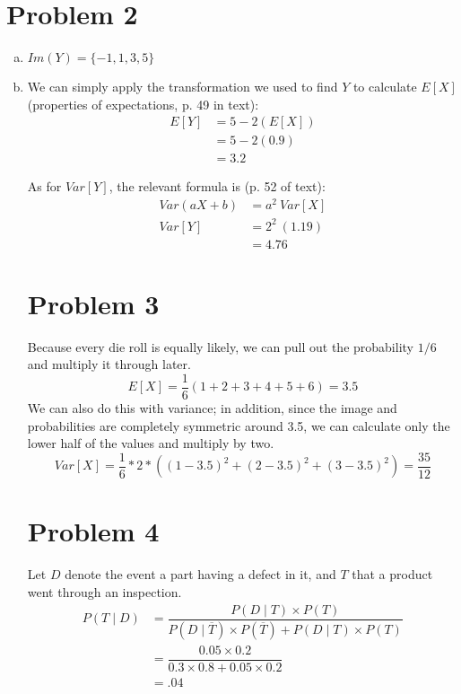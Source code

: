 \documentclass[11pt]{article}
\begin{document}
\section*{Problem 2}
\begin{enumerate}[(a)]
	\item $Im(Y) = \{-1, 1, 3, 5\}$
	
	\item We can simply apply the transformation we used to find $Y$ to calculate $E[X]$ (properties of expectations, p. 49 in text):
		\begin{align*}
		E[Y] &= 5 - 2( E[X] ) \\
		&= 5 - 2( 0.9 ) \\
		&= 3.2
		\end{align*}
		
		As for $Var[Y]$, the relevant formula is (p. 52 of text):
		\begin{align*}
			Var(aX + b) &= a^2\ Var[X] \\
			Var[Y] &= 2^2\ (1.19) \\
			&= 4.76
		\end{align*}
		
\section*{Problem 3}
Because every die roll is equally likely, we can pull out the probability $1/6$ and multiply it through later.
	\[E[X] = \dfrac{1}{6}( 1+2+3+4+5+6) = 3.5 \]
We can also do this with variance; in addition, since the image and probabilities are completely symmetric around 3.5, we can calculate only the lower half of the values and multiply by two.
	\[Var[X] = \dfrac{1}{6} * 2 * ( (1-3.5)^2 + (2 - 3.5)^2 + (3-3.5)^2 ) = \dfrac{35}{12} \]
	
\section*{Problem 4}
Let $D$ denote the event a part having a defect in it, and $T$ that a product went through an inspection.
\begin{align*}
	P(T \mid D) &= \dfrac{P(D \mid T) \times P(T)}{P(D \mid \overline{T}) \times P(\overline{T}) + P(D \mid T) \times P(T)} \\
	&= \dfrac{0.05 \times 0.2}{ 0.3 \times 0.8 + 0.05 \times 0.2 } \\
	&= .04
\end{align*}
	
	
		

\end{enumerate}
\end{document}
